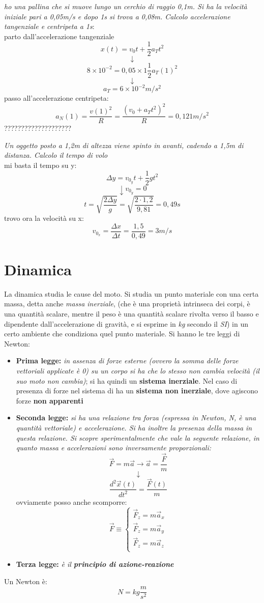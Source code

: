 \documentclass[a4paper,12pt, oneside]{book}
\begin{document}
\begin{esercizio}
\textit{ho una pallina che si muove lungo un cerchio di raggio 0,1m. Si ha la velocità iniziale pari a 0,05m/s e dopo 1s si trova a 0,08m. Calcolo accelerazione tangenziale e centripeta a 1s}:\\
parto dall'accelerazione tangenziale
$$x(t)=v_0t+\frac{1}{2}a_Tt^2$$
$$\downarrow$$
$$8\times 10^{-2}=0,05\times 1\frac{1}{2}a_T(1)^2$$
$$\downarrow$$
$$a_T=6\times 10^{-2}m/s^2$$
passo all'accelerazione centripeta:
$$a_N(1)=\frac{v(1)^2}{R}=\frac{(v_0+a_Tt^2)^2}{R}=0,121m/s^2$$
????????????????????
\end{esercizio}
\begin{esercizio}
\textit{Un oggetto posto a 1,2m di altezza viene spinto in avanti, cadendo a 1,5m di distanza. Calcolo il tempo di volo}\\
mi basta il tempo su y:
$$\Delta y= v_{0_y}t+\frac{1}{2}gt^2$$
$$\downarrow v_{0_y}=0$$
$$t=\sqrt{\frac{2\Delta y}{g}}=\sqrt{\frac{2\cdot 1,2}{9,81}}=0,49s$$
trovo ora la velocità su x:
$$v_{0_x}=\frac{\Delta x}{\Delta t}=\frac{1,5}{0,49}=3m/s$$
\end{esercizio}
\newpage
\section{Dinamica}
La dinamica studia le cause del moto. Si studia un punto materiale con una certa massa, detta anche \textit{massa inerziale}, (che è una proprietà intrinseca dei corpi, è una quantità scalare, mentre il peso è una quantità scalare rivolta verso il basso e dipendente dall'accelerazione di gravità, e si esprime in \textit{kg} secondo il \textit{SI}) in un certo ambiente che condiziona quel punto materiale. Si hanno le tre leggi di Newton:
\begin{itemize}
\item \textbf{Prima legge:} \textit{in assenza di forze esterne (ovvero la somma delle forze vettoriali applicate è 0) su un corpo si ha che lo stesso non cambia velocità (il suo moto non cambia)}; si ha quindi un \textbf{sistema inerziale}. Nel caso di presenza di forze nel sistema di ha un \textbf{sistema non inerziale}, dove agiscono forze \textbf{non apparenti}
\item \textbf{Seconda legge:} \textit{si ha una relazione tra forza (espressa in Newton, N, è una quantità vettoriale) e accelerazione. Si ha inoltre la presenza della massa in questa relazione. Si scopre sperimentalmente che vale la seguente relazione, in quanto massa e accelerazioni sono inversamente proporzionali:}
$$\vec{F}=m\vec{a}\to \vec{a}=\frac{\vec{F}}{m}$$
$$\downarrow$$
$$\frac{d^2\vec{x}(t)}{dt^2}=\frac{\vec{F}(t)}{m}$$
ovviamente posso anche scomporre:
$$\vec{F}\equiv
\begin{cases}
\vec{F}_z=m\vec{a}_x\\
\vec{F}_z=m\vec{a}_y\\
\vec{F}_z=m\vec{a}_z\\
\end{cases}$$
\item \textbf{Terza legge:} \textit{è il \textbf{principio di azione-reazione}}
\end{itemize}
Un Newton è: 
$$N=kg\frac{m}{s^2}$$
\newpage
\end{document}
